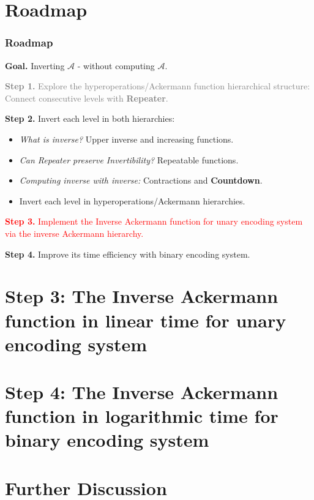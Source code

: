 \documentclass[10pt]{beamer}
\newcommand{\Ack}{\ensuremath{\mathcal{A}}}
\begin{document}
\section*{Roadmap}
\begin{frame}
\frametitle{Roadmap}
\textbf{Goal.} Inverting $\Ack$ - without computing $\Ack$.

\bigskip

\textcolor<1-2>{gray}{\textbf{Step 1.} Explore the hyperoperations/Ackermann function hierarchical structure: Connect consecutive levels with \textbf{Repeater}.}

\bigskip

{ \textbf{Step 2.} Invert each level in both hierarchies:
	{ \small
		\begin{itemize}\itemsep0em
			\color<1-2>{gray}
			\item \emph{What is inverse?} Upper inverse and increasing functions.
			\item \emph{Can Repeater preserve Invertibility?} Repeatable functions.
			\item \emph{Computing inverse with inverse:} Contractions and \textbf{Countdown}.
			\item Invert each level in hyperoperations/Ackermann hierarchies.
		\end{itemize}
	}
}

\bigskip

\textcolor<2>{red}{\textbf{Step 3.} Implement the Inverse Ackermann function for unary encoding system via the inverse Ackermann hierarchy.}

\bigskip

\textbf{Step 4.} Improve its time efficiency with binary encoding system.
\end{frame}


\section{Step 3: The Inverse Ackermann function in linear time for unary encoding system}
\label{sec: inv-ack}


\section{Step 4: The Inverse Ackermann function in logarithmic time for binary encoding system}
\label{sec: binary}
%

\section{Further Discussion}
\label{sec: discussion}
%

%
%
\end{document}
